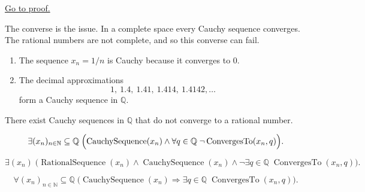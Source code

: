 \begin{remark*}[Proof]
\hyperref[prf:convergent-implies-cauchy-q]{Go to proof.}
\end{remark*}

\begin{remark}
The converse is the issue.  In a complete space every Cauchy sequence converges.  The rational
numbers are not complete, and so this converse can fail.
\end{remark}

\begin{remark}[Examples]
\begin{enumerate}
  \item The sequence $x_n=1/n$ is Cauchy because it converges to $0$.
  \item The decimal approximations
  \[
  1,\ 1.4,\ 1.41,\ 1.414,\ 1.4142,\dots
  \]
  form a Cauchy sequence in $\mathbb{Q}$.
\end{enumerate}
\end{remark}

\begin{tcolorbox}[colback=thmbox, colframe=thmborder, arc=2pt,
  left=6pt, right=6pt, top=4pt, bottom=4pt,
  title={\small\textbf{Theorem (There Exist Cauchy Sequences in $\mathbb{Q}$ That Do Not Converge to a Rational Number)}},
  fonttitle=\small\bfseries]
\begin{theorem}
\label{thm:cauchy-not-convergent-q}
There exist Cauchy sequences in $\mathbb{Q}$ that do not converge to a rational number.
\end{theorem}
\end{tcolorbox}

\begin{remark*}
\[
\exists (x_n)_{n\in\mathbb{N}}\subseteq \mathbb{Q}\;
\Bigl(
\operatorname{CauchySequence}(x_n)
\land
\forall q\in\mathbb{Q}\;\neg\operatorname{ConvergesTo}(x_n,q)
\Bigr).
\]
\end{remark*}

\begin{remark*}
\[
\exists (x_n)\;
\bigl(
\operatorname{RationalSequence}(x_n)
\land
\operatorname{CauchySequence}(x_n)
\land
\neg\exists q\in\mathbb{Q}\;\operatorname{ConvergesTo}(x_n,q)
\bigr).
\]
\end{remark*}

\begin{remark*}
\[
\forall (x_n)_{n\in\mathbb{N}}\subseteq \mathbb{Q}\;
\bigl(
\operatorname{CauchySequence}(x_n)
\Longrightarrow
\exists q\in\mathbb{Q}\;\operatorname{ConvergesTo}(x_n,q)
\bigr).
\]
\end{remark*}


